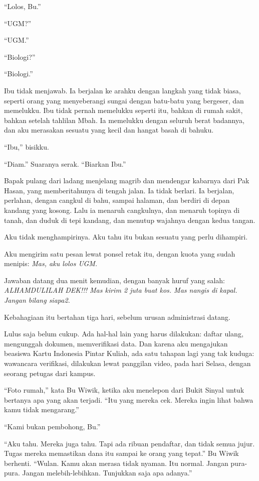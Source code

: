 \documentclass[11pt,twoside,openany]{book}
\makeatletter
\newcommand{\scenebreak}{\par\vspace{0.9em}{\centering\textsc{*\hspace{0.7em}*\hspace{0.7em}*}\par}\vspace{0.9em}\@afterindentfalse\@afterheading}
\makeatother
\begin{document}
``Lolos, Bu.''

``UGM?''

``UGM.''

``Biologi?''

``Biologi.''

Ibu tidak menjawab. Ia berjalan ke arahku dengan langkah yang tidak biasa, seperti orang yang menyeberangi sungai dengan batu-batu yang bergeser, dan memelukku. Ibu tidak pernah memelukku seperti itu, bahkan di rumah sakit, bahkan setelah tahlilan Mbah. Ia memelukku dengan seluruh berat badannya, dan aku merasakan sesuatu yang kecil dan hangat basah di bahuku.

``Ibu,'' bisikku.

``Diam.'' Suaranya serak. ``Biarkan Ibu.''

Bapak pulang dari ladang menjelang magrib dan mendengar kabarnya dari Pak Hasan, yang memberitahunya di tengah jalan. Ia tidak berlari. Ia berjalan, perlahan, dengan cangkul di bahu, sampai halaman, dan berdiri di depan kandang yang kosong. Lalu ia menaruh cangkulnya, dan menaruh topinya di tanah, dan duduk di tepi kandang, dan menutup wajahnya dengan kedua tangan.

Aku tidak menghampirinya. Aku tahu itu bukan sesuatu yang perlu dihampiri.

Aku mengirim satu pesan lewat ponsel retak itu, dengan kuota yang sudah menipis: \emph{Mas, aku lolos UGM.}

Jawaban datang dua menit kemudian, dengan banyak huruf yang salah: \emph{ALHAMDULILAH DEK!!! Mas kirim 2 juta buat kos. Mas nangis di kapal. Jangan bilang siapa2.}

\scenebreak
Kebahagiaan itu bertahan tiga hari, sebelum urusan administrasi datang.

Lulus saja belum cukup. Ada hal-hal lain yang harus dilakukan: daftar ulang, mengunggah dokumen, memverifikasi data. Dan karena aku mengajukan beasiswa Kartu Indonesia Pintar Kuliah, ada satu tahapan lagi yang tak kuduga: wawancara verifikasi, dilakukan lewat panggilan video, pada hari Selasa, dengan seorang petugas dari kampus.

``Foto rumah,'' kata Bu Wiwik, ketika aku menelepon dari Bukit Sinyal untuk bertanya apa yang akan terjadi. ``Itu yang mereka cek. Mereka ingin lihat bahwa kamu tidak mengarang.''

``Kami bukan pembohong, Bu.''

``Aku tahu. Mereka juga tahu. Tapi ada ribuan pendaftar, dan tidak semua jujur. Tugas mereka memastikan dana itu sampai ke orang yang tepat.'' Bu Wiwik berhenti. ``Wulan. Kamu akan merasa tidak nyaman. Itu normal. Jangan pura-pura. Jangan melebih-lebihkan. Tunjukkan saja apa adanya.''
\end{document}
